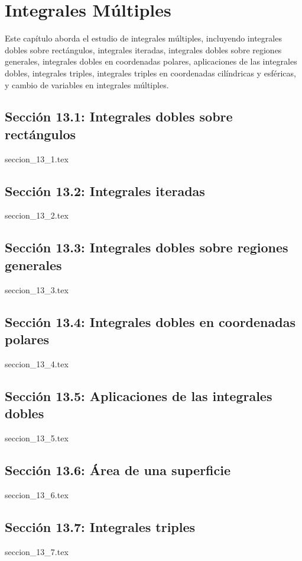\chapter{Integrales Múltiples}
\label{cap:integrales_multiples}

Este capítulo aborda el estudio de integrales múltiples, incluyendo integrales dobles sobre rectángulos, integrales iteradas, integrales dobles sobre regiones generales, integrales dobles en coordenadas polares, aplicaciones de las integrales dobles, integrales triples, integrales triples en coordenadas cilíndricas y esféricas, y cambio de variables en integrales múltiples.

\section*{Sección 13.1: Integrales dobles sobre rectángulos}
{seccion_13_1.tex}

\section*{Sección 13.2: Integrales iteradas}
{seccion_13_2.tex}

\section*{Sección 13.3: Integrales dobles sobre regiones generales}
{seccion_13_3.tex}

\section*{Sección 13.4: Integrales dobles en coordenadas polares}
{seccion_13_4.tex}

\section*{Sección 13.5: Aplicaciones de las integrales dobles}
{seccion_13_5.tex}

\section*{Sección 13.6: Área de una superficie}
{seccion_13_6.tex}

\section*{Sección 13.7: Integrales triples}
{seccion_13_7.tex}

